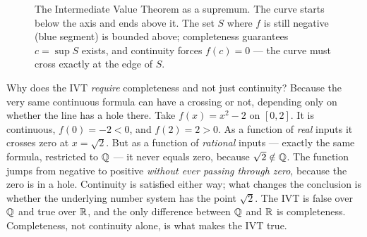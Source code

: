 \begin{figure}[H]
\centering
{}
\caption{The Intermediate Value Theorem as a supremum. The curve starts below the axis and
ends above it. The set $S$ where $f$ is still negative (blue segment) is bounded above;
completeness guarantees $c=\sup S$ exists, and continuity forces $f(c)=0$ --- the curve must cross
exactly at the edge of $S$.}
\label{ch41:fig-ivt}
\end{figure}

\begin{whybox}
Why does the IVT \emph{require} completeness and not just continuity? Because the very same
continuous formula can have a crossing or not, depending only on whether the line has a
hole there. Take $f(x)=x^2-2$ on $[0,2]$. It is continuous, $f(0)=-2<0$, and $f(2)=2>0$. As
a function of \emph{real} inputs it crosses zero at $x=\sqrt2$. But as a function of
\emph{rational} inputs --- exactly the same formula, restricted to $\mathbb{Q}$ --- it never equals
zero, because $\sqrt2\notin\mathbb{Q}$. The function jumps from negative to positive
\emph{without ever passing through zero}, because the zero is in a hole. Continuity is
satisfied either way; what changes the conclusion is whether the underlying number system
has the point $\sqrt2$. The IVT is false over $\mathbb{Q}$ and true over $\mathbb{R}$, and the only
difference between $\mathbb{Q}$ and $\mathbb{R}$ is completeness. Completeness, not continuity alone, is what
makes the IVT true.
\end{whybox}

